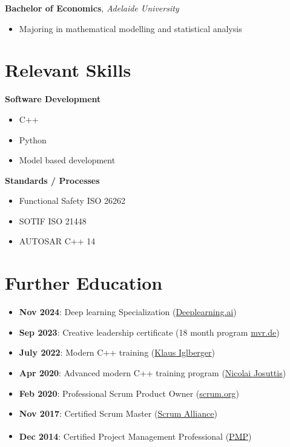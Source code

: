 \documentclass[10pt,a4paper]{article}
\begin{document}
\textbf{\textcolor{primary}{Bachelor of Economics}}, \textit{Adelaide University} \\
\begin{itemize}
    \item Majoring in mathematical modelling and statistical analysis
\end{itemize}

\vspace{1.2em}

\section*{Relevant Skills}

\begin{minipage}[t]{0.48\textwidth}
    \textbf{\textcolor{primary}{Software Development}}
    \begin{itemize}
        \item C++
        \item Python
        \item Model based development
    \end{itemize}
\end{minipage}
\hfill
\begin{minipage}[t]{0.48\textwidth}
    \textbf{\textcolor{primary}{Standards / Processes}}
    \begin{itemize}
        \item Functional Safety ISO 26262
        \item SOTIF ISO 21448
        \item AUTOSAR C++ 14
    \end{itemize}
\end{minipage}

\vspace{1.2em}

\section*{Further Education}

\begin{itemize}
    \item \textbf{Nov 2024}: Deep learning Specialization (\href{https://www.deeplearning.ai}{Deeplearning.ai})
    \item \textbf{Sep 2023}: Creative leadership certificate (18 month program \href{https://mvr.de}{mvr.de})
    \item \textbf{July 2022}: Modern C++ training (\href{https://klaus-iglberger.com}{Klaus Iglberger})
    \item \textbf{Apr 2020}: Advanced modern C++ training program (\href{https://nicolaijosuttis.com}{Nicolai Josuttis})
    \item \textbf{Feb 2020}: Professional Scrum Product Owner (\href{https://scrum.org}{scrum.org})
    \item \textbf{Nov 2017}: Certified Scrum Master (\href{https://scrumalliance.org}{Scrum Alliance})
    \item \textbf{Dec 2014}: Certified Project Management Professional (\href{https://www.pmi.org}{PMP}\textsuperscript{\textregistered})
\end{itemize}
\end{document}
